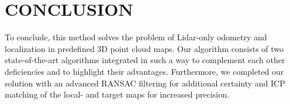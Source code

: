 \documentclass[letterpaper, 10 pt, conference]{ieeeconf}  %
\begin{document}
\section{CONCLUSION} \label{conclusion}
To conclude, this method solves the problem of Lidar-only odometry and localization in predefined 3D point cloud maps. Our algorithm consists of two state-of-the-art algorithms integrated in such a way to complement each other deficiencies and to highlight their advantages. Furthermore, we completed our solution with an advanced RANSAC filtering for additional certainty and ICP matching of the local- and target maps for increased precision.

\addtolength{\textheight}{-8cm}   %










\end{document}
